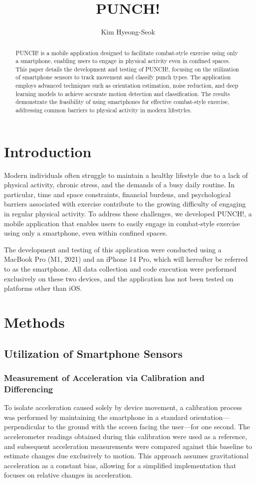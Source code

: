 \documentclass{article}
\title{\textbf{PUNCH!}}
\author{Kim Hyeong-Seok}
\begin{document}
\maketitle
\begin{abstract}
    PUNCH! is a mobile application designed to facilitate combat-style exercise using only a smartphone, enabling users to engage in physical activity even in confined spaces. This paper details the development and testing of PUNCH!, focusing on the utilization of smartphone sensors to track movement and classify punch types. The application employs advanced techniques such as orientation estimation, noise reduction, and deep learning models to achieve accurate motion detection and classification. The results demonstrate the feasibility of using smartphones for effective combat-style exercise, addressing common barriers to physical activity in modern lifestyles.
\end{abstract}

\section{Introduction}
Modern individuals often struggle to maintain a healthy lifestyle due to a lack of physical activity, chronic stress, and the demands of a busy daily routine. In particular, time and space constraints, financial burdens, and psychological barriers associated with exercise contribute to the growing difficulty of engaging in regular physical activity. To address these challenges, we developed PUNCH!, a mobile application that enables users to easily engage in combat-style exercise using only a smartphone, even within confined spaces.

The development and testing of this application were conducted using a MacBook Pro (M1, 2021) and an iPhone 14 Pro, which will hereafter be referred to as the smartphone. All data collection and code execution were performed exclusively on these two devices, and the application has not been tested on platforms other than iOS.
\section{Methods}
\subsection{Utilization of Smartphone Sensors}
\subsubsection{Measurement of Acceleration via Calibration and Differencing}
To isolate acceleration caused solely by device movement, a calibration process was performed by maintaining the smartphone in a standard orientation—perpendicular to the ground with the screen facing the user—for one second. The accelerometer readings obtained during this calibration were used as a reference, and subsequent acceleration measurements were compared against this baseline to estimate changes due exclusively to motion. This approach assumes gravitational acceleration as a constant bias, allowing for a simplified implementation that focuses on relative changes in acceleration.
\end{document}
